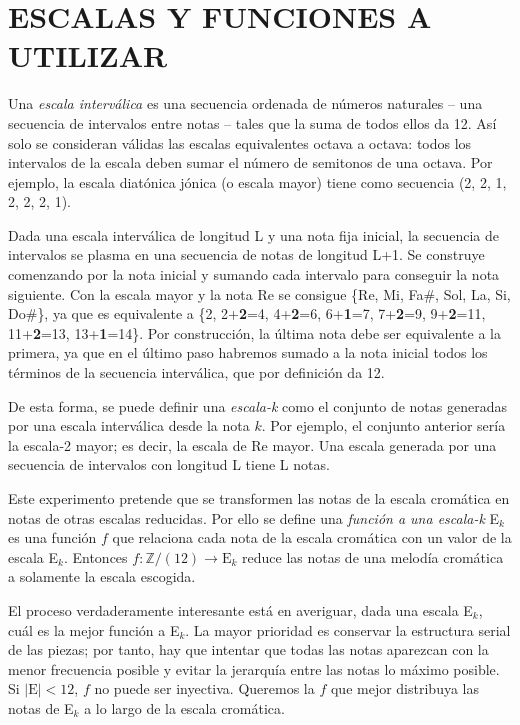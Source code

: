 	\section{ESCALAS Y FUNCIONES A UTILIZAR}
	
		Una \textit{escala interválica} es una secuencia ordenada de números naturales -- una secuencia de intervalos entre notas -- tales que la suma de todos ellos da 12. Así solo se consideran válidas las escalas equivalentes octava a octava: todos los intervalos de la escala deben sumar el número de semitonos de una octava. Por ejemplo, la escala diatónica jónica (o escala mayor) tiene como secuencia (2, 2, 1, 2, 2, 2, 1).
		
		
		Dada una escala interválica de longitud L y una nota fija inicial, la secuencia de intervalos se plasma en una secuencia de notas de longitud L+1. Se construye comenzando por la nota inicial y sumando cada intervalo para conseguir la nota siguiente. Con la escala mayor y la nota Re se consigue \{Re, Mi, Fa$\#$, Sol, La, Si, Do$\#$\}, ya que es equivalente a \{2, 2+\textbf{2}=4, 4+\textbf{2}=6, 6+\textbf{1}=7, 7+\textbf{2}=9, 9+\textbf{2}=11, 11+\textbf{2}=13, 13+\textbf{1}=14\}. Por construcción, la última nota debe ser equivalente a la primera, ya que en el último paso habremos sumado a la nota inicial todos los términos de la secuencia interválica, que por definición da 12.
		
		De esta forma, se puede definir una \textit{escala-k} como el conjunto de notas generadas por una escala interválica desde la nota $k$. Por ejemplo, el conjunto anterior sería la escala-2 mayor; es decir, la escala de Re mayor. Una escala generada por una secuencia de intervalos con longitud L tiene L notas.
		
		Este experimento pretende que se transformen las notas de la escala cromática en notas de otras escalas reducidas. Por ello se define una \textit{función a una escala-k} E$_k$ es una función $f$ que relaciona cada nota de la escala cromática con un valor de la escala E$_k$. Entonces $f : \mathbb{Z}/(12) \rightarrow \text{E}_k$ reduce las notas de una melodía cromática a solamente la escala escogida.
		
		El proceso verdaderamente interesante está en averiguar, dada una escala E$_k$, cuál es la mejor función a E$_k$. La mayor prioridad es conservar la estructura serial de las piezas; por tanto, hay que intentar que todas las notas aparezcan con la menor frecuencia posible y evitar la jerarquía entre las notas lo máximo posible. Si $|\text{E}|<12$, $f$ no puede ser inyectiva. Queremos la $f$ que mejor distribuya las notas de E$_k$ a lo largo de la escala cromática. 
		
